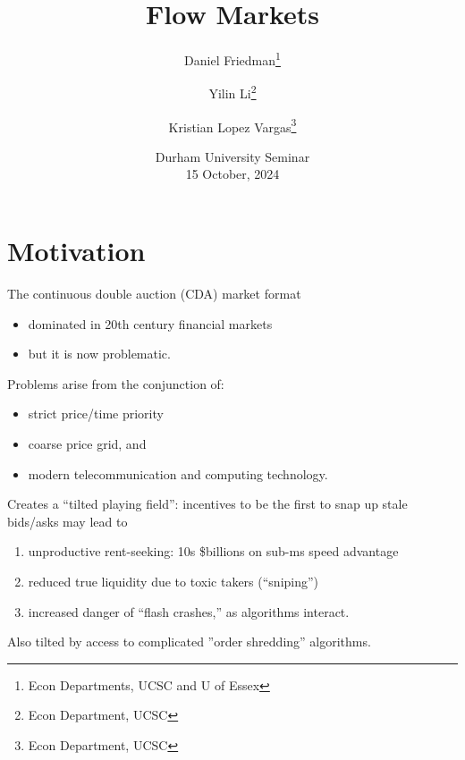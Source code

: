 \documentclass[10pt]{beamer}
\title[FlowMkts]{Flow Markets}
\author[DF]{Daniel Friedman\thanks{Econ Departments, UCSC and U of Essex}
\and Yilin Li\thanks{Econ Department, UCSC}
\and Kristian Lopez Vargas\thanks{Econ Department, UCSC}
}
\begin{document}
\date[UQ]{Durham University Seminar\\
15 October, 2024
} 

\frame{\titlepage} 






\section{Motivation}
\begin{frame}{
The continuous double auction (CDA) market format}
\begin{itemize}
\item dominated in 20th century financial markets 
\item but it is now problematic.  %
\end{itemize}
Problems arise from the conjunction of:
\begin{itemize}
\item strict price/time priority  
\item coarse price grid, and 
\item modern telecommunication and computing technology.

 \end{itemize} 
 \end{frame}

\begin{frame}{Creates a ``tilted playing field'': }
incentives to be the first to snap up stale bids/asks may lead to
\begin{enumerate}
\item unproductive rent-seeking: 10s \$billions on sub-ms speed advantage %
\item reduced true liquidity due to toxic takers (``sniping'') %
\item increased danger of ``flash crashes,'' as algorithms interact. %
  \end{enumerate}
Also tilted by access to complicated ''order shredding'' algorithms.
\end{frame}
\end{document}
